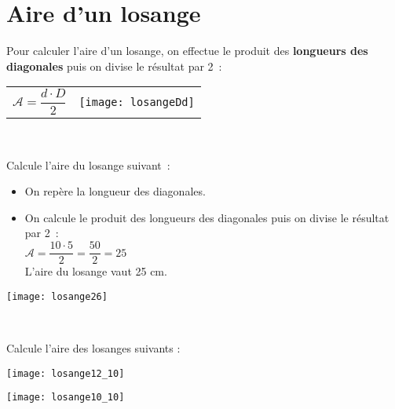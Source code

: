 
\newpage


\section{Aire d'un losange}

\vspace{2em}

\begin{aconnaitre}
Pour calculer l’aire d’un losange, on effectue le produit des \textbf{\textcolor{H1}{longueurs des diagonales}} puis on divise le résultat par 2 : 

\begin{tabularx}{\textwidth}{XX}
{\large $\mathcal{A} = \dfrac{d \cdot D}{2}$} & \texttt{[image: losangeDd]} \\
 \end{tabularx} \\
 \end{aconnaitre}

\vspace{4em}

\begin{methode*1}


 
 \begin{exemple*1}
Calcule l’aire du losange suivant :
\begin{minipage}[c]{0.68\textwidth}
\begin{itemize}
 \item On repère la longueur des diagonales.
 \item On calcule le produit des longueurs des diagonales puis on divise le résultat par 2 : \\[0.3em]
$\mathcal{A} = \dfrac{10 \cdot 5}{2} = \dfrac{50}{2} = 25$ \\[0.3em]
L'aire du losange vaut 25 cm.
 \end{itemize}
 \end{minipage} \hfill%
 \begin{minipage}[c]{0.2\textwidth}
 \texttt{[image: losange26]}
 \end{minipage} \\
\end{exemple*1}

 
 \exercice
Calcule l’aire des losanges suivants :
\begin{colenumerate}{2}
 \item
 
 \texttt{[image: losange12\_10]}
 \item
 
 \texttt{[image: losange10\_10]}
 \end{colenumerate}

\end{methode*1}
